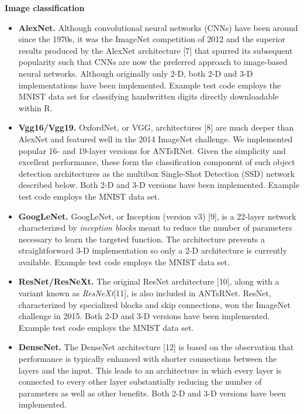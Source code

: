 \documentclass[11pt,]{article}
\begin{document}
\textbf{Image classification}

\begin{itemize}
\item
  \textbf{AlexNet.} Although convolutional neural networks (CNNs) have
  been around since the 1970s, it was the ImageNet competition of 2012
  and the superior results produced by the AlexNet architecture {[}7{]}
  that spurred its subsequent popularity such that CNNs are now the
  preferred approach to image-based neural networks. Although originally
  only 2-D, both 2-D and 3-D implementations have been implemented.
  Example test code employs the MNIST data set for classifying
  handwritten digits directly downloadable within R.
\item
  \textbf{Vgg16/Vgg19.} OxfordNet, or VGG, architectures {[}8{]} are
  much deeper than AlexNet and featured well in the 2014 ImageNet
  challenge. We implemented popular 16- and 19-layer versions for
  ANTsRNet. Given the simplicity and excellent performance, these form
  the classification component of such object detection architectures as
  the multibox Single-Shot Detection (SSD) network described below. Both
  2-D and 3-D versions have been implemented. Example test code employs
  the MNIST data set.
\item
  \textbf{GoogLeNet.} GoogLeNet, or Inception (version v3) {[}9{]}, is a
  22-layer network characterized by \emph{inception blocks} meant to
  reduce the number of parameters necessary to learn the targeted
  function. The architecture prevents a straightforward 3-D
  implementation so only a 2-D architecture is currently available.
  Example test code employs the MNIST data set.
\item
  \textbf{ResNet/ResNeXt.} The original ResNet architecture {[}10{]},
  along with a variant known as \emph{ResNeXt}{[}11{]}, is also included
  in ANTsRNet. ResNet, characterized by specialized blocks and skip
  connections, won the ImageNet challenge in 2015. Both 2-D and 3-D
  versions have been implemented. Example test code employs the MNIST
  data set.
\item
  \textbf{DenseNet.} The DenseNet architecture {[}12{]} is based on the
  observation that performance is typically enhanced with shorter
  connections between the layers and the input. This leads to an
  architecture in which every layer is connected to every other layer
  substantially reducing the number of parameters as well as other
  benefits. Both 2-D and 3-D versions have been implemented.
\end{itemize}
\end{document}
